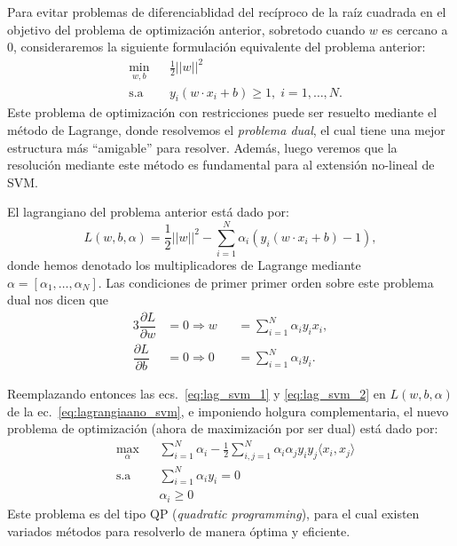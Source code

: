 Para evitar problemas de diferenciablidad del recíproco de la raíz cuadrada en el objetivo del problema de optimización anterior, sobretodo cuando $w$ es cercano a 0, consideraremos la siguiente formulación equivalente del problema anterior:
\begin{equation*}
\begin{aligned}
& \underset{w,b}{\text{min}}
& & \frac{1}{2}||w||^2\\
& \text{s.a}
& & y_i (w\cdot x_i +b) \geq 1, \; i = 1, \ldots, N.
\end{aligned}
\end{equation*}
Este problema de optimización con restricciones puede ser resuelto mediante el método de Lagrange, donde resolvemos el \emph{problema dual}, el cual tiene una mejor estructura más ``amigable'' para resolver. Además, luego veremos que la resolución mediante este método es fundamental para al extensión no-lineal de SVM.

El lagrangiano del problema anterior está dado por:
\begin{equation}
    L(w,b,\alpha) = \frac{1}{2}||w||^2 - \sum\limits_{i=1}^{N} \alpha_i (y_i (w\cdot x_i +b) -1),\label{eq:lagrangiaano_svm}
\end{equation}
donde hemos denotado los multiplicadores de Lagrange mediante $\alpha = [\alpha_1,\ldots,\alpha_N]$. Las condiciones de primer primer orden sobre este problema dual nos dicen que
\begin{alignat}{3}
    \dfrac{\partial L}{\partial w} &= 0 \Rightarrow w &&= \sum\limits_{i=1}^{N} \alpha_i y_i x_i, \label{eq:lag_svm_1}\\
    \dfrac{\partial L}{\partial b} &= 0 \Rightarrow 0 &&=\sum\limits_{i=1}^{N} \alpha_i y_i.  \label{eq:lag_svm_2}
\end{alignat}

Reemplazando entonces las ecs.~\eqref{eq:lag_svm_1} y \eqref{eq:lag_svm_2} en $L(w,b, \alpha)$ de la ec.~\eqref{eq:lagrangiaano_svm},  e imponiendo holgura complementaria, el nuevo problema de optimización (ahora de maximización por ser dual) está dado por: 
\begin{equation}
\begin{aligned}
& \underset{\alpha}{\text{max}}
& & \sum\limits_{i=1}^{N}\alpha_i - \frac{1}{2} \sum\limits_{i,j=1}^{N} \alpha_i \alpha_j y_i y_j \langle x_i, x_j\rangle\\
& \text{s.a}
& & \sum\limits_{i=1}^{N} \alpha_i y_i= 0 \\
& &  &\alpha_i \geq 0
\end{aligned} \label{eq:dualSVM}
\end{equation}
Este problema es del tipo QP (\emph{quadratic programming}), para el cual existen variados métodos para resolverlo de manera óptima y eficiente. 

